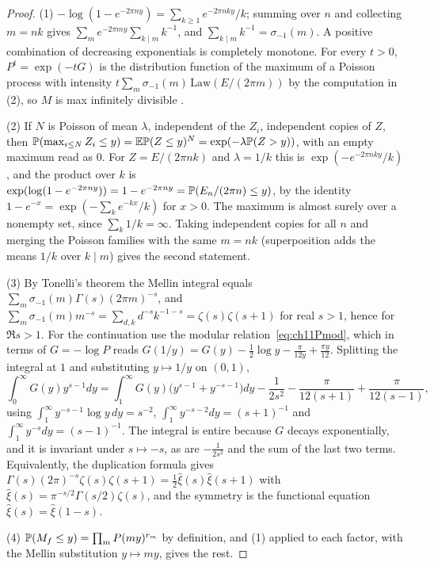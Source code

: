 \begin{proof}
(1) $-\log(1-e^{-2\pi ny})=\sum_{k\ge1}e^{-2\pi nky}/k$; summing over $n$ and collecting $m=nk$ gives $\sum_me^{-2\pi my}\sum_{k\mid m}k^{-1}$, and $\sum_{k\mid m}k^{-1}=\sigma_{-1}(m)$. A positive combination of decreasing exponentials is completely monotone. For every $t>0$, $P^t=\exp(-tG)$ is the distribution function of the maximum of a Poisson process with intensity $t\sum_m\sigma_{-1}(m)\,\mathrm{Law}(E/(2\pi m))$ by the computation in (2), so $M$ is max infinitely divisible \cite{resnick1987}.

(2) If $N$ is Poisson of mean $\lambda$, independent of the $Z_i$, independent copies of $Z$, then $\mathbb{P}(\max_{i\le N}Z_i\le y)=\mathbb{E}\mathbb{P}(Z\le y)^N=\exp(-\lambda\mathbb{P}(Z>y))$, with an empty maximum read as $0$. For $Z=E/(2\pi nk)$ and $\lambda=1/k$ this is $\exp(-e^{-2\pi nky}/k)$, and the product over $k$ is $\exp(\log(1-e^{-2\pi ny}))=1-e^{-2\pi ny}=\mathbb{P}(E_n/(2\pi n)\le y)$, by the identity $1-e^{-x}=\exp(-\sum_ke^{-kx}/k)$ for $x>0$. The maximum is almost surely over a nonempty set, since $\sum_k1/k=\infty$. Taking independent copies for all $n$ and merging the Poisson families with the same $m=nk$ (superposition adds the means $1/k$ over $k\mid m$) gives the second statement.

(3) By Tonelli's theorem the Mellin integral equals $\sum_m\sigma_{-1}(m)\Gamma(s)(2\pi m)^{-s}$, and $\sum_m\sigma_{-1}(m)m^{-s}=\sum_{d,k}d^{-s}k^{-1-s}=\zeta(s)\zeta(s+1)$ for real $s>1$, hence for $\Re s>1$. For the continuation use the modular relation~\eqref{eq:ch11Pmod}, which in terms of $G=-\log P$ reads $G(1/y)=G(y)-\frac12\log y-\frac{\pi}{12y}+\frac{\pi y}{12}$. Splitting the integral at $1$ and substituting $y\mapsto1/y$ on $(0,1)$,
\[
\int_0^\infty G(y)y^{s-1}dy=\int_1^\infty G(y)\bigl(y^{s-1}+y^{-s-1}\bigr)dy-\frac1{2s^2}-\frac{\pi}{12(s+1)}+\frac{\pi}{12(s-1)},
\]
using $\int_1^\infty y^{-s-1}\log y\,dy=s^{-2}$, $\int_1^\infty y^{-s-2}dy=(s+1)^{-1}$ and $\int_1^\infty y^{-s}dy=(s-1)^{-1}$. The integral is entire because $G$ decays exponentially, and it is invariant under $s\mapsto-s$, as are $-\frac1{2s^2}$ and the sum of the last two terms. Equivalently, the duplication formula gives $\Gamma(s)(2\pi)^{-s}\zeta(s)\zeta(s+1)=\frac12\hat\xi(s)\hat\xi(s+1)$ with $\hat\xi(s)=\pi^{-s/2}\Gamma(s/2)\zeta(s)$, and the symmetry is the functional equation $\hat\xi(s)=\hat\xi(1-s)$.

(4) $\mathbb{P}(M_f\le y)=\prod_mP(my)^{r_m}$ by definition, and (1) applied to each factor, with the Mellin substitution $y\mapsto my$, gives the rest.
\end{proof}


